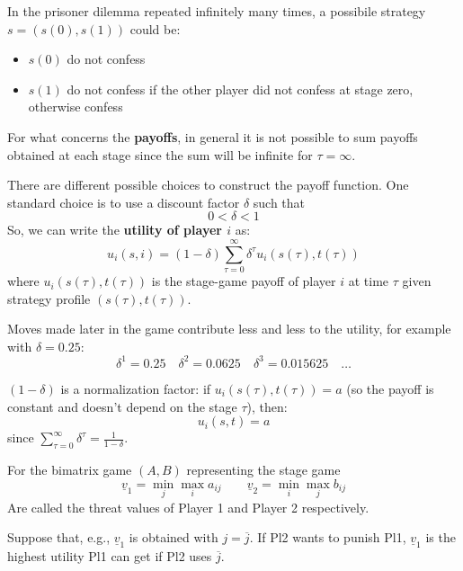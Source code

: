 \documentclass[../main.tex]{subfiles}
\begin{document}
\begin{example}
    In the prisoner dilemma repeated infinitely many times, a possibile strategy $s = (s(0), s(1))$ could be:
    \begin{itemize}
        \item $s(0)$ do not confess
        \item $s(1)$ do not confess if the other player did not confess at stage zero, otherwise confess
    \end{itemize}
\end{example}

For what concerns the \textbf{payoffs}, in general it is not possible to sum payoffs obtained at each stage since the sum will be infinite for $\tau = \infty$.

There are different possible choices to construct the payoff function. One standard choice is to use a discount factor $\delta$ such that
\[
    0 < \delta < 1
\]
So, we can write the \textbf{utility of player $i$} as:
\[
    u_i(s,i) = (1-\delta) \sum_{\tau = 0}^{\infty} \delta^\tau u_i(s(\tau),t(\tau))
\]
where $u_i (s(\tau),t(\tau))$ is the stage-game payoff of player $i$ at time $\tau$ given strategy profile $(s(\tau),t(\tau))$.

\begin{note}
    Moves made later in the game contribute less and less to the utility, for example with $\delta = 0.25$:
    \[
        \delta^1 = 0.25 \quad \delta^2 = 0.0625 \quad \delta^3 = 0.015625 \quad \ldots
    \]
\end{note}

$(1-\delta)$ is a normalization factor: if $u_i (s(\tau),t(\tau)) = a$ (so the payoff is constant and doesn't depend on the stage $\tau$), then:
\[
    u_i (s,t) = a
\]
since $\sum_{\tau = 0}^{\infty} \delta^\tau = \frac{1}{1-\delta}$.

\begin{definition}
    For the bimatrix game $(A,B)$ representing the stage game
    \begin{equation*}
        \underline{v}_1 = \min_j \max_i a_{ij} \qquad \underline{v}_2 = \min_i \max_j b_{ij}
    \end{equation*}
    Are called the threat values of Player 1 and Player 2 respectively.
\end{definition}
Suppose that, e.g., $\underline{v}_1$ is obtained with $j = \overline{j}$. If Pl2 wants to punish Pl1, $\underline{v}_1$ is the highest utility Pl1 can get if Pl2 uses $\overline{j}$.
\end{document}
